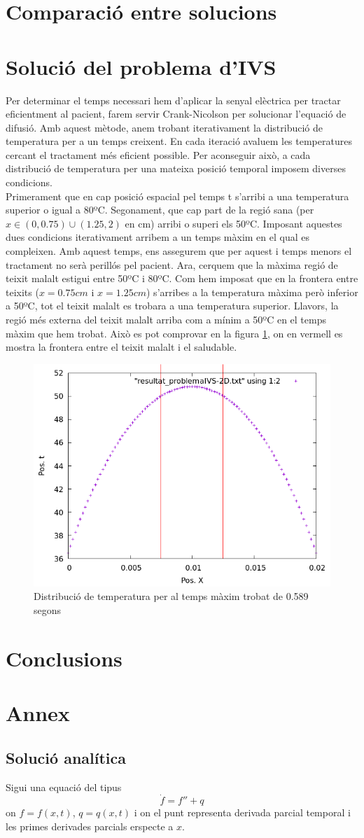 \documentclass{article}
\begin{document}
\section{Comparació entre solucions}

\section{Solució del problema d'IVS}
Per determinar el temps necessari hem d'aplicar la senyal elèctrica per tractar eficientment al pacient, farem servir Crank-Nicolson per solucionar l'equació de difusió. Amb aquest mètode, anem trobant iterativament la distribució de temperatura per a un temps creixent. En cada iteració avaluem les temperatures cercant el tractament més eficient possible. Per aconseguir això, a cada distribució de temperatura per una mateixa posició temporal imposem diverses condicions. \\ Primerament que en cap posició espacial pel temps t s'arribi a una temperatura superior o igual a 80ºC. Segonament, que cap part de la regió sana (per $x\in(0,0.75) \cup (1.25,2)$ en cm) arribi o superi els 50ºC. Imposant aquestes dues condicions iterativament arribem a un temps màxim en el qual es compleixen. Amb aquest temps, ens assegurem que per aquest i temps menors el tractament no serà perillós pel pacient. Ara, cerquem que la màxima regió de teixit malalt estigui entre 50ºC i 80ºC. Com hem imposat que en la frontera entre teixits ($x =0.75cm$ i $x=1.25cm$) s'arribes a la temperatura màxima però inferior a 50ºC, tot el teixit malalt es trobara a una temperatura superior. Llavors, la regió més externa del teixit malalt arriba com a mínim a 50ºC en el temps màxim que hem trobat. Això es pot comprovar en la figura \ref{fig:solucion_ivs}, on en vermell es mostra la frontera entre el teixit malalt i el saludable. 

\begin{figure}[h]
    \centering
    \includegraphics[width=0.5\linewidth]{images/solucion_IVS-2D.png}
    \caption{Distribució de temperatura per al temps màxim trobat de 0.589 segons}
    \label{fig:solucion_ivs}
\end{figure}

\section{Conclusions}
\section{Annex}\label{Annex I}
\subsection{Solució analítica}
Sigui una equació del tipus
\begin{equation*}
    \dot{f} = f'' + q
\end{equation*}
on $f = f(x,t)$, $q =q(x,t)$ i on el punt representa derivada parcial temporal i les primes derivades parcials erspecte a $x$.
\end{document}
